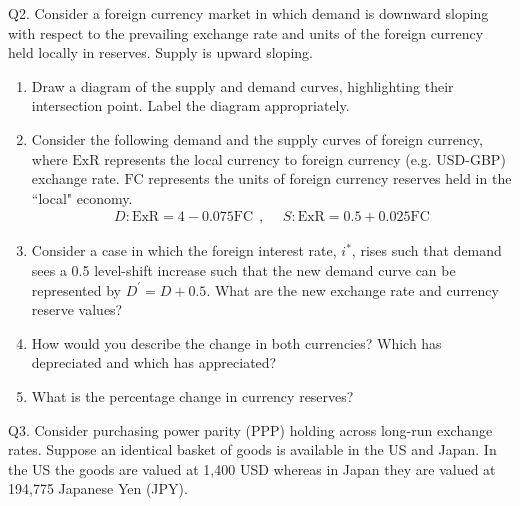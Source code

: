 \documentclass[12pt]{article}
\begin{document}
\newpage

\noindent Q2. Consider a foreign currency market in which demand is downward sloping with respect to the prevailing exchange rate and units of the foreign currency held locally in reserves. Supply is upward sloping.

\begin{enumerate}[1)]
	\item Draw a diagram of the supply and demand curves, highlighting their intersection point. Label the diagram appropriately. 
	
	\vspace{2in}
	
	\newpage
	
	\item Consider the following demand and the supply curves of foreign currency, where $\text{ExR}$ represents the local currency to foreign currency (e.g. USD-GBP) exchange rate.
	$\text{FC}$ represents the units of foreign currency reserves held in the ``local" economy. 
	\begin{align*}
	D: \text{ExR} =  4 - 0.075 \text{FC} \ \ , & \ \ S: \text{ExR} =  0.5 + 0.025 \text{FC}
	\end{align*}
	
	\vspace{2.6in}
	
	\item Consider a case in which the foreign interest rate, $i^*$, rises such that demand sees a 0.5 level-shift increase such that the new demand curve can be represented by $D^{'} = D + 0.5$.
	What are the new exchange rate and currency reserve values?
	
	\newpage
	
	\item How would you describe the change in both currencies? Which has depreciated and which has appreciated?
	
	\vspace{1.6in}
	
	\item What is the percentage change in currency reserves?
	
	\vspace{1.3in}
	
\end{enumerate}


\noindent Q3. Consider purchasing power parity (PPP) holding across long-run exchange rates.
Suppose an identical basket of goods is available in the US and Japan. In the US the goods are valued at 1,400 USD whereas in Japan they are valued at 194,775 Japanese Yen (JPY).
\end{document}
